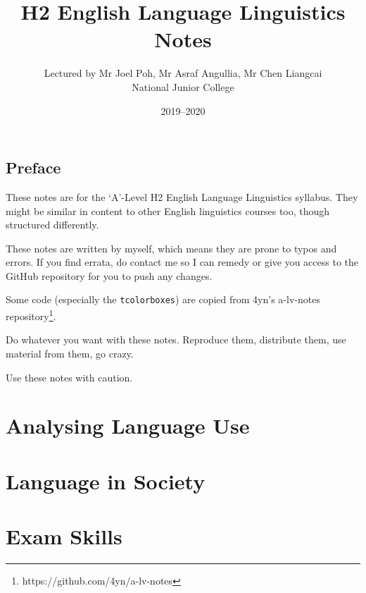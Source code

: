 \documentclass[10pt]{book}
\title{H2 English Language Linguistics Notes}
\author{Lectured by Mr Joel Poh, Mr Asraf Angullia, Mr Chen Liangcai \\ National Junior College}
\date{2019--2020}
\begin{document}
\frontmatter

\maketitle

\vspace*{\fill}
\chapter*{Preface}
These notes are for the `A'-Level H2 English Language Linguistics syllabus. They might be similar in content to other English linguistics courses too, though structured differently.

These notes are written by myself, which means they are prone to typos and errors. If you find errata, do contact me so I can remedy or give you access to the GitHub repository for you to push any changes.

Some code (especially the \texttt{tcolorboxes}) are copied from 4yn's a-lv-notes repository\footnote{https://github.com/4yn/a-lv-notes}.

Do whatever you want with these notes. Reproduce them, distribute them, use material from them, go crazy. 

Use these notes with caution.

\newpage
\begin{multicols}{2}
\tableofcontents
\end{multicols}

\newpage

\mainmatter
\part{Analysing Language Use}
\begin{multicols}{2}








\end{multicols}

\part{Language in Society}
\begin{multicols}{2}














\end{multicols}

\part*{Exam Skills}
\begin{multicols}{2}

\end{multicols}
\end{document}
